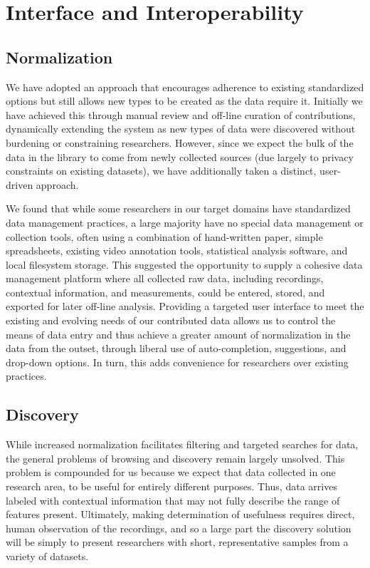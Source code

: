 \documentclass{sig-alternate}
\begin{document}
\section{Interface and Interoperability}

\subsection{Normalization}

We have adopted an approach that encourages adherence to existing standardized options but still allows new types to be created as the data require it.
Initially we have achieved this through manual review and off-line curation of contributions, dynamically extending the system as new types of data were discovered without burdening or constraining researchers.
However, since we expect the bulk of the data in the library to come from newly collected sources (due largely to privacy constraints on existing datasets), we have additionally taken a distinct, user-driven approach.

We found that while some researchers in our target domains have standardized data management practices, a large majority have no special data management or collection tools, often using a combination of hand-written paper, simple spreadsheets, existing video annotation tools, statistical analysis software, and local filesystem storage.
This suggested the opportunity to supply a cohesive data management platform where all collected raw data, including recordings, contextual information, and measurements, could be entered, stored, and exported for later off-line analysis.
Providing a targeted user interface to meet the existing and evolving needs of our contributed data allows us to control the means of data entry and thus achieve a greater amount of normalization in the data from the outset, through liberal use of auto-completion, suggestions, and drop-down options.
In turn, this adds convenience for researchers over existing practices.

\subsection{Discovery}

While increased normalization facilitates filtering and targeted searches for data, the general problems of browsing and discovery remain largely unsolved.
This problem is compounded for us because we expect that data collected in one research area, to be useful for entirely different purposes.
Thus, data arrives labeled with contextual information that may not fully describe the range of features present.
Ultimately, making determination of usefulness requires direct, human observation of the recordings, and so a large part the discovery solution will be simply to present researchers with short, representative samples from a variety of datasets.
\end{document}
